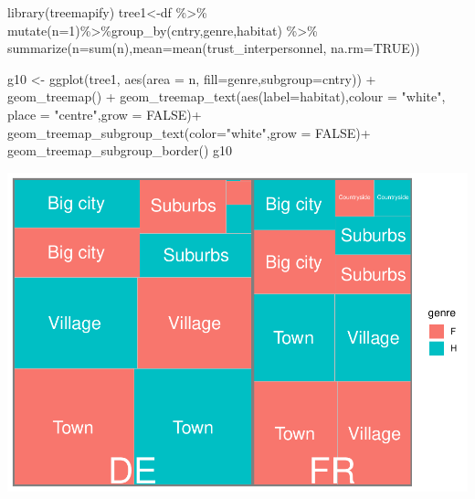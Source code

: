 \documentclass[
]{book}
\newenvironment{Shaded}{\begin{snugshade}}{\end{snugshade}}
\newcommand{\AttributeTok}[1]{\textcolor[rgb]{0.77,0.63,0.00}{#1}}
\newcommand{\ConstantTok}[1]{\textcolor[rgb]{0.00,0.00,0.00}{#1}}
\newcommand{\DecValTok}[1]{\textcolor[rgb]{0.00,0.00,0.81}{#1}}
\newcommand{\FunctionTok}[1]{\textcolor[rgb]{0.00,0.00,0.00}{#1}}
\newcommand{\NormalTok}[1]{#1}
\newcommand{\OtherTok}[1]{\textcolor[rgb]{0.56,0.35,0.01}{#1}}
\newcommand{\SpecialCharTok}[1]{\textcolor[rgb]{0.00,0.00,0.00}{#1}}
\newcommand{\StringTok}[1]{\textcolor[rgb]{0.31,0.60,0.02}{#1}}
\begin{document}
\begin{Shaded}
\begin{Highlighting}[]
\FunctionTok{library}\NormalTok{(treemapify)}
\NormalTok{tree1}\OtherTok{\textless{}{-}}\NormalTok{df }\SpecialCharTok{\%\textgreater{}\%} \FunctionTok{mutate}\NormalTok{(}\AttributeTok{n=}\DecValTok{1}\NormalTok{)}\SpecialCharTok{\%\textgreater{}\%}\FunctionTok{group\_by}\NormalTok{(cntry,genre,habitat) }\SpecialCharTok{\%\textgreater{}\%} \FunctionTok{summarize}\NormalTok{(}\AttributeTok{n=}\FunctionTok{sum}\NormalTok{(n),}\AttributeTok{mean=}\FunctionTok{mean}\NormalTok{(trust\_interpersonnel, }\AttributeTok{na.rm=}\ConstantTok{TRUE}\NormalTok{))}

\NormalTok{g10 }\OtherTok{\textless{}{-}} \FunctionTok{ggplot}\NormalTok{(tree1, }\FunctionTok{aes}\NormalTok{(}\AttributeTok{area =}\NormalTok{ n, }\AttributeTok{fill=}\NormalTok{genre,}\AttributeTok{subgroup=}\NormalTok{cntry)) }\SpecialCharTok{+}
  \FunctionTok{geom\_treemap}\NormalTok{() }\SpecialCharTok{+}   
  \FunctionTok{geom\_treemap\_text}\NormalTok{(}\FunctionTok{aes}\NormalTok{(}\AttributeTok{label=}\NormalTok{habitat),}\AttributeTok{colour =} \StringTok{"white"}\NormalTok{, }\AttributeTok{place =} \StringTok{"centre"}\NormalTok{,}\AttributeTok{grow =} \ConstantTok{FALSE}\NormalTok{)}\SpecialCharTok{+}
      \FunctionTok{geom\_treemap\_subgroup\_text}\NormalTok{(}\AttributeTok{color=}\StringTok{"white"}\NormalTok{,}\AttributeTok{grow =} \ConstantTok{FALSE}\NormalTok{)}\SpecialCharTok{+}
  \FunctionTok{geom\_treemap\_subgroup\_border}\NormalTok{()}
\NormalTok{g10}
\end{Highlighting}
\end{Shaded}

\includegraphics{bookdown-demo_files/figure-latex/0431-1.pdf}
\end{document}
